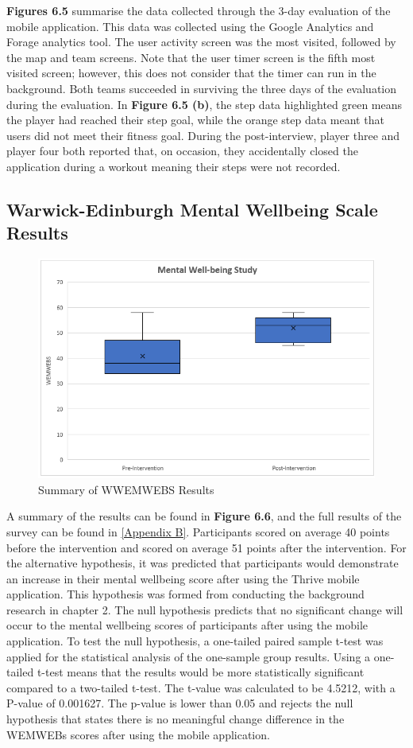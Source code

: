 \documentclass{l4proj}
\begin{document}
 
\textbf{Figures 6.5} summarise the data collected through the 3-day evaluation of the mobile application. This data was collected using the Google Analytics and Forage analytics tool. The user activity screen was the most visited, followed by the map and team screens. Note that the user timer screen is the fifth most visited screen; however, this does not consider that the timer can run in the background. Both teams succeeded in surviving the three days of the evaluation during the evaluation. In \textbf{Figure 6.5 (b)}, the step data highlighted green means the player had reached their step goal, while the orange step data meant that users did not meet their fitness goal. During the post-interview, player three and player four both reported that, on occasion, they accidentally closed the application during a workout meaning their steps were not recorded. 

\subsection{Warwick-Edinburgh Mental Wellbeing Scale Results} 
   \begin{figure}[h]
    \centering
     \includegraphics[width=120mm]{dissertation/images/22.png}
     \caption{Summary of WWEMWEBS Results}
     \setlength{\belowcaptionskip}{-10pt}
     \label{fig: Forms of exercise}
 \end{figure}
A summary of the results can be found in \textbf{Figure 6.6}, and the full results of the survey can be found in \ref{Appendix B}. Participants scored on average 40 points before the intervention and scored on average 51 points after the intervention. For the alternative hypothesis, it was predicted that participants would demonstrate an increase in their mental wellbeing score after using the Thrive mobile application. This hypothesis was formed from conducting the background research in chapter 2. The null hypothesis predicts that no significant change will occur to the mental wellbeing scores of participants after using the mobile application. To test the null hypothesis, a one-tailed paired sample t-test was applied for the statistical analysis of the one-sample group results. Using a one-tailed t-test means that the results would be more statistically significant compared to a two-tailed t-test. The t-value was calculated to be 4.5212, with a P-value of 0.001627. The p-value is lower than 0.05 and rejects the null hypothesis that states there is no meaningful change difference in the WEMWEBs scores after using the mobile application. 
\end{document}
